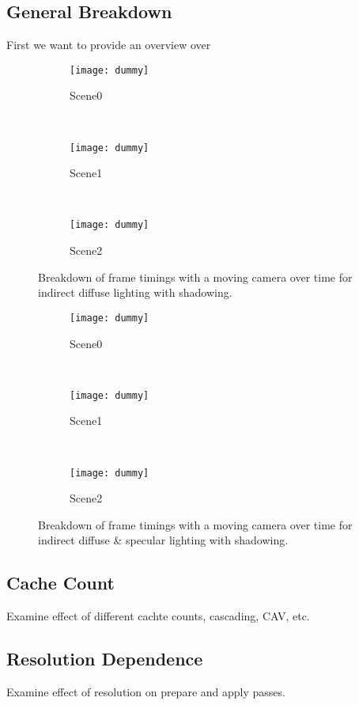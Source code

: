 \documentclass[thesis.tex]{subfiles}
\begin{document}
\subsection{General Breakdown}
First we want to provide an overview over 

\begin{figure}
\centering
\begin{subfigure}[b]{0.2\textwidth}
\centering
\texttt{[image: dummy]}
\caption{Scene0}
\end{subfigure}
\\
\begin{subfigure}[b]{0.2\textwidth}
\centering
\texttt{[image: dummy]}
\caption{Scene1}
\end{subfigure}
\\
\begin{subfigure}[b]{0.2\textwidth}
\centering
\texttt{[image: dummy]}
\caption{Scene2}
\end{subfigure}
\caption{Breakdown of frame timings with a moving camera over time for indirect diffuse lighting with shadowing.}
\label{fig:frameratebreakdown:specoff}
\end{figure}
\begin{figure}
\centering
\begin{subfigure}[b]{0.2\textwidth}
\centering
\texttt{[image: dummy]}
\caption{Scene0}
\end{subfigure}
\\
\begin{subfigure}[b]{0.2\textwidth}
\centering
\texttt{[image: dummy]}
\caption{Scene1}
\end{subfigure}
\\
\begin{subfigure}[b]{0.2\textwidth}
\centering
\texttt{[image: dummy]}
\caption{Scene2}
\end{subfigure}
\caption{Breakdown of frame timings with a moving camera over time for indirect diffuse \& specular lighting with shadowing.}
\label{fig:frameratebreakdown:specon}
\end{figure}

\subsection{Cache Count}
Examine effect of different cachte counts, cascading, CAV, etc.

\subsection{Resolution Dependence}
Examine effect of resolution on prepare and apply passes.
\end{document}
